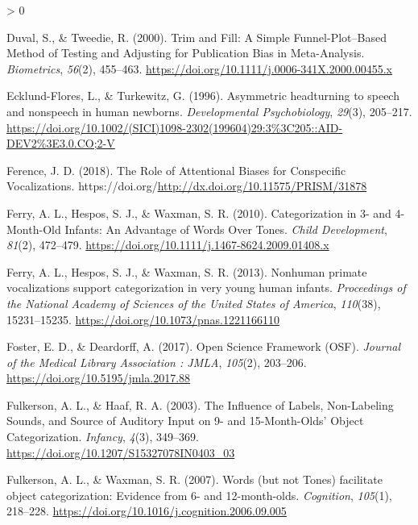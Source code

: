 \documentclass[
  english,
  man]{apa6}
\newlength{\cslhangindent}
\newenvironment{CSLReferences}[2] %
 {%
  \setlength{\parindent}{0pt}
  \ifodd #1 \everypar{\setlength{\hangindent}{\cslhangindent}}\ignorespaces\fi
  \ifnum #2 > 0
  \setlength{\parskip}{#2\baselineskip}
  \fi
 }%
 {}
\begin{document}
\begin{CSLReferences}{1}{0}
\leavevmode\hypertarget{ref-duval_trim_2000}{}%
Duval, S., \& Tweedie, R. (2000). Trim and {Fill}: {A} {Simple} {Funnel}-{Plot}--{Based} {Method} of {Testing} and {Adjusting} for {Publication} {Bias} in {Meta}-{Analysis}. \emph{Biometrics}, \emph{56}(2), 455--463. \url{https://doi.org/10.1111/j.0006-341X.2000.00455.x}

\leavevmode\hypertarget{ref-ecklund-flores_asymmetric_1996}{}%
Ecklund-Flores, L., \& Turkewitz, G. (1996). Asymmetric headturning to speech and nonspeech in human newborns. \emph{Developmental Psychobiology}, \emph{29}(3), 205--217. \url{https://doi.org/10.1002/(SICI)1098-2302(199604)29:3\%3C205::AID-DEV2\%3E3.0.CO;2-V}

\leavevmode\hypertarget{ref-ference_role_2018}{}%
Ference, J. D. (2018). The {Role} of {Attentional} {Biases} for {Conspecific} {Vocalizations}. https://doi.org/\url{http://dx.doi.org/10.11575/PRISM/31878}

\leavevmode\hypertarget{ref-ferry_categorization_2010}{}%
Ferry, A. L., Hespos, S. J., \& Waxman, S. R. (2010). Categorization in 3- and 4-{Month}-{Old} {Infants}: {An} {Advantage} of {Words} {Over} {Tones}. \emph{Child Development}, \emph{81}(2), 472--479. \url{https://doi.org/10.1111/j.1467-8624.2009.01408.x}

\leavevmode\hypertarget{ref-ferry_nonhuman_2013}{}%
Ferry, A. L., Hespos, S. J., \& Waxman, S. R. (2013). Nonhuman primate vocalizations support categorization in very young human infants. \emph{Proceedings of the National Academy of Sciences of the United States of America}, \emph{110}(38), 15231--15235. \url{https://doi.org/10.1073/pnas.1221166110}

\leavevmode\hypertarget{ref-foster_open_2017}{}%
Foster, E. D., \& Deardorff, A. (2017). Open {Science} {Framework} ({OSF}). \emph{Journal of the Medical Library Association : JMLA}, \emph{105}(2), 203--206. \url{https://doi.org/10.5195/jmla.2017.88}

\leavevmode\hypertarget{ref-fulkerson_influence_2003}{}%
Fulkerson, A. L., \& Haaf, R. A. (2003). The {Influence} of {Labels}, {Non}-{Labeling} {Sounds}, and {Source} of {Auditory} {Input} on 9- and 15-{Month}-{Olds}' {Object} {Categorization}. \emph{Infancy}, \emph{4}(3), 349--369. \url{https://doi.org/10.1207/S15327078IN0403_03}

\leavevmode\hypertarget{ref-fulkerson_words_2007}{}%
Fulkerson, A. L., \& Waxman, S. R. (2007). Words (but not {Tones}) facilitate object categorization: {Evidence} from 6- and 12-month-olds. \emph{Cognition}, \emph{105}(1), 218--228. \url{https://doi.org/10.1016/j.cognition.2006.09.005}


\end{CSLReferences}
\end{document}
